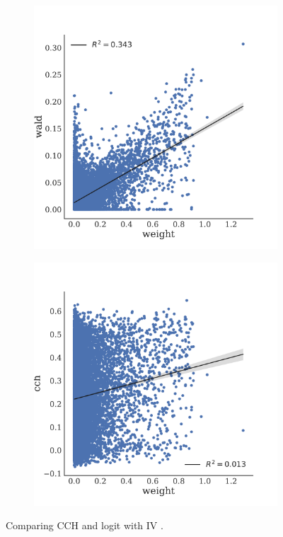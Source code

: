 \documentclass[11pt]{article}
\begin{document}
\begin{figure}
\medskip
\begin{subfigure}{0.485\textwidth} \includegraphics[scale=.25]{fit_wald}
\caption{} \label{fig:network-class:3}
\end{subfigure}\hfill
\begin{subfigure}{0.485\textwidth} \includegraphics[scale=.25]{fit_cch}
\caption{} \label{fig:network-class:4}
\end{subfigure}
\caption{Comparing CCH and logit with IV . \label{fig:network-class}}
\end{figure}
\end{document}
